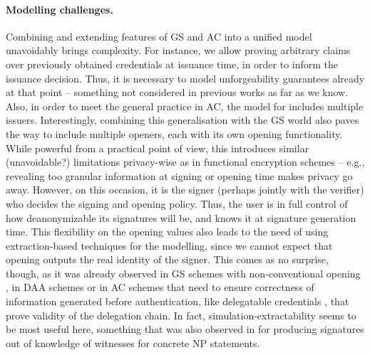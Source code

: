 \paragraph{Modelling challenges.} %
Combining and extending features of GS and AC into a unified model unavoidably
brings complexity. For instance, we allow proving arbitrary claims over
previously obtained credentials at issuance time, in order to inform the
issuance decision. Thus, it is necessary to model unforgeability guarantees
already at that point -- something not considered in previous works as far as
we know. Also, in
order to meet the general practice in AC, the model for \UAS includes multiple
issuers. Interestingly, combining this generalisation with the GS world also
paves the way to include multiple openers, each with its own opening
functionality. While powerful from a practical point of view, this introduces
similar (unavoidable?) limitations privacy-wise as in functional encryption
schemes \cite{bsw11} -- e.g., revealing too granular information at signing or
opening time makes privacy go away. However, on this occasion, it is the signer
(perhaps jointly with the verifier) who decides the signing and
opening policy. Thus, the user is in full control of how deanonymizable its
signatures will be, and knows it at signature generation time. This flexibility
on the opening values also leads to the
need of using extraction-based techniques for the modelling, since we cannot
expect that opening outputs the real identity of the signer. This comes as no
surprise, though, as it was already observed in GS schemes with non-conventional
opening \cite{dl21}, in DAA schemes \cite{cdl16,cdl16b} or in AC schemes that
need to ensure correctness of information generated before authentication, like
delegatable credentials \cite{bcc+09}, that prove validity of the delegation
chain. In fact, simulation-extractability seems to be most useful here,
something that was also observed in \cite{cl06} for producing signatures out of
knowledge of witnesses for concrete NP statements.


